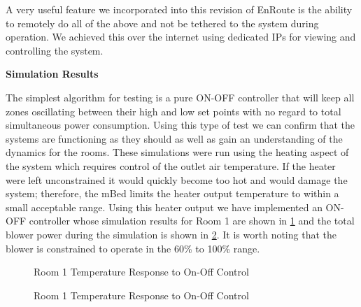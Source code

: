 \documentclass[a4paper,10pt,twocolumn]{article}
\begin{document}
A very useful feature we incorporated into this revision of EnRoute is the ability to remotely do all of the above and not be tethered to the system during operation.  We achieved this over the internet using dedicated IPs for viewing and controlling the system.

\begin{center}
{\bf Simulation Results}
\end{center}

The simplest algorithm for testing is a pure ON-OFF controller that will keep all zones oscillating between their high and low set points with no regard to total simultaneous power consumption.  Using this type of test we can confirm that the systems are functioning as they should as well as gain an understanding of the dynamics for the rooms.  These simulations were run using the heating aspect of the system which requires control of the outlet air temperature.  If the heater were left unconstrained it would quickly become too hot and would damage the system; therefore, the mBed limits the heater output temperature to within a small acceptable range.  Using this heater output we have implemented an ON-OFF controller whose simulation results for Room 1 are shown in \ref{on_off_rm1_temp} and the total blower power during the simulation is shown in \ref{on_off_blower}.  It is worth noting that the blower is constrained to operate in the 60\% to 100\% range.

\begin{figure}[t]
\centering
{}
\caption{Room 1 Temperature Response to On-Off Control}
\label{on_off_rm1_temp}
\end{figure}

\begin{figure}[t]
\centering
{}
\caption{Room 1 Temperature Response to On-Off Control}
\label{on_off_blower}
\end{figure}
\end{document}
